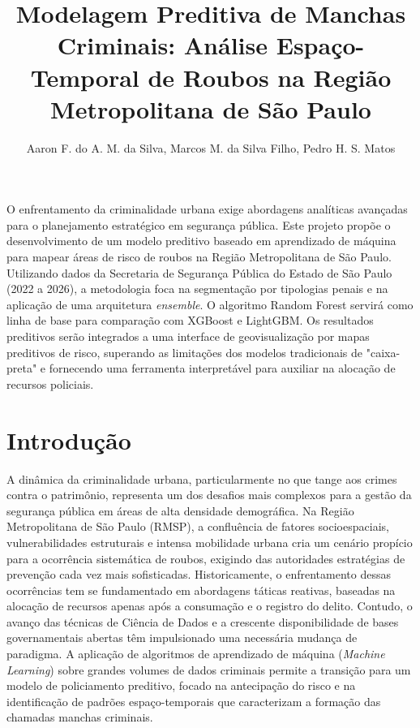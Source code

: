 \documentclass[12pt]{article}
\title{Modelagem Preditiva de Manchas Criminais: Análise Espaço-Temporal de Roubos na Região Metropolitana de São Paulo}
\author{Aaron F. do A. M. da Silva\inst{1}, Marcos M. da Silva Filho\inst{2}, Pedro H. S. Matos\inst{3}}
\begin{document}
 

\maketitle
     
\begin{resumo} 
  O enfrentamento da criminalidade urbana exige abordagens analíticas avançadas para o planejamento estratégico em segurança pública. Este projeto propõe o desenvolvimento de um modelo preditivo baseado em aprendizado de máquina para mapear áreas de risco de roubos na Região Metropolitana de São Paulo. Utilizando dados da Secretaria de Segurança Pública do Estado de São Paulo (2022 a 2026), a metodologia foca na segmentação por tipologias penais e na aplicação de uma arquitetura \textit{ensemble}. O algoritmo Random Forest servirá como linha de base para comparação com XGBoost e LightGBM. Os resultados preditivos serão integrados a uma interface de geovisualização por mapas preditivos de risco, superando as limitações dos modelos tradicionais de "caixa-preta" e fornecendo uma ferramenta interpretável para auxiliar na alocação de recursos policiais.
\end{resumo}


\vspace{0.5cm}


\section{Introdução}
A dinâmica da criminalidade urbana, particularmente no que tange aos crimes contra o patrimônio, representa um dos desafios mais complexos para a gestão da segurança pública em áreas de alta densidade demográfica. Na Região Metropolitana de São Paulo (RMSP), a confluência de fatores socioespaciais, vulnerabilidades estruturais e intensa mobilidade urbana cria um cenário propício para a ocorrência sistemática de roubos, exigindo das autoridades estratégias de prevenção cada vez mais sofisticadas. Historicamente, o enfrentamento dessas ocorrências tem se fundamentado em abordagens táticas reativas, baseadas na alocação de recursos apenas após a consumação e o registro do delito. Contudo, o avanço das técnicas de Ciência de Dados e a crescente disponibilidade de bases governamentais abertas têm impulsionado uma necessária mudança de paradigma. A aplicação de algoritmos de aprendizado de máquina (\textit{Machine Learning}) sobre grandes volumes de dados criminais permite a transição para um modelo de policiamento preditivo, focado na antecipação do risco e na identificação de padrões espaço-temporais que caracterizam a formação das chamadas manchas criminais.
\end{document}
